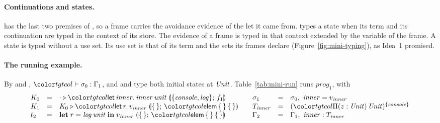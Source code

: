 \paragraph{Continuations and states.}
 has the last two premises of , so a frame carries the avoidance evidence of the let it came from.  types a state when its term and its continuation are typed in the context of its store. The evidence of a frame is typed in that context extended by the variable of the frame. A state is typed without a use set. Its use set is that of its term and the sets its frames declare (Figure~\ref{fig:mini-typing}), as Idea~1 promised.

\paragraph{The running example.}
By  and , $\storej{\sigma_0}{\Gamma_1}$, and  and  type both initial states at $\mathit{Unit}$. Table~\ref{tab:mini-run} runs $\mathit{prog}_1$, with
\[
\begin{array}{@{}lcl@{\qquad}lcl@{}}
K_0 & = & \cdot \triangleright \frlet{\mathit{inner}}{\mathit{inner}\,\mathit{unit}}{\cset{\mathit{console}, \mathit{log}}}{f_1} &
\sigma_1 & = & \sigma_0,\ \mathit{inner} = v_{\mathit{inner}} \\
K_1 & = & K_0 \triangleright \frlet{r}{v_{\mathit{inner}}}{\cempty}{\ev{elem}\,\cempty\,\cempty} &
T_{\mathit{inner}} & = & \capt{(\pit[z]{\Unit}{\Unit})}{\cset{\mathit{console}}} \\
t_2 & = & \letc{r}{\mathit{log}\,\mathit{unit}}{v_{\mathit{inner}}}{\cempty}{\ev{elem}\,\cempty\,\cempty} &
\Gamma_2 & = & \Gamma_1,\ \mathit{inner} : T_{\mathit{inner}}
\end{array}
\]

